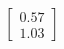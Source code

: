 \documentclass[preview]{standalone}
\begin{document}
\begin{align*}
\begin{bmatrix} 0.57 \\ 1.03 \end{bmatrix}
\end{align*}
\end{document}
